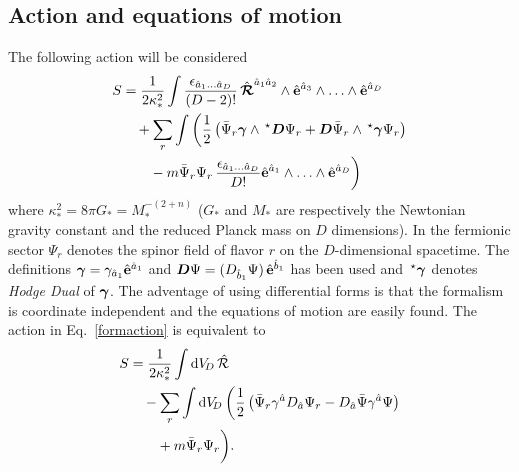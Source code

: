 \subsection{Action and equations of motion}
The following action will be considered
\begin{align}
  \nonumber
  S &= \frac{1}{2\kappa_*^2}\int\frac{\epsilon_{\hat{a}_1\ldots\hat{a}_D}}{(D-2)!}\,\Rfh^{\hat{a}_1\hat{a}_2}\wedge\vifh^{\hat{a}_3}\wedge\ldots\wedge\vifh^{\hat{a}_D} \\
  \nonumber
  &\quad+ \sum_{r}\int\bigg(\frac{1}{2}\left(\bar{\Psi}_r\gf\wedge\hodge\Df\Psi_r + \Df\bar{\Psi}_r\wedge\hodge\gf\Psi_r\right) \\
  \label{formaction}
  &\qquad- m\bar{\Psi}_r\Psi_r\,\frac{\epsilon_{\hat{a}_1\ldots\hat{a}_D}}{D!}\vifh^{\hat{a}_1}\wedge\ldots\wedge\vifh^{\hat{a}_D}\bigg)
\end{align}
where $\kappa_*^2 = 8\pi G_* = M_*^{-(2+n)}$ ($G_*$ and $M_*$ are  respectively the  Newtonian gravity constant and the reduced Planck mass on $D$ dimensions). In the fermionic sector $\Psi_r$ denotes the spinor field of flavor $r$ on the $D$-dimensional spacetime. The definitions ${\boldsymbol{\gamma}} = \gamma_{\hat{a}_1}\hat{{\bf{e}}}^{\hat{a}_1}$ and ${\boldsymbol{D}}\Psi = (D_{\hat{b}_1}\Psi)\,\hat{{\bf{e}}}^{\hat{b}_1}$ has been used and $\,{}^\star{\boldsymbol{\gamma}}$ denotes {\it{Hodge Dual}} of ${\boldsymbol{\gamma}}$. The adventage of using differential forms is that the formalism is coordinate independent and the equations of motion are easily found. The action in Eq.~\eqref{formaction} is equivalent to
\begin{align}
  \nonumber
  S &= \frac{1}{2\kappa_*^2}\int \dv[D]\,\hat{\R} \\ 
  \nonumber
  &\quad -\sum_{r}\int \dv[D]\,\bigg(\frac{1}{2}\left(\bar{\Psi}_r\gamma^{\hat{a}}D_{\hat{a}}\Psi_r - D_{\hat{a}}\bar{\Psi}\gamma^{\hat{a}}\Psi\right)\\
  \label{coordinateaction}
  &\qquad + m\bar{\Psi}_r\Psi_r\bigg).
\end{align}


